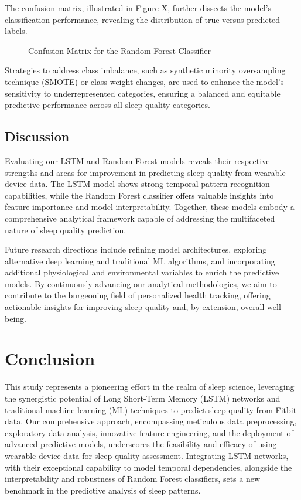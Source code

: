 \documentclass[10pt]{extarticle}
\begin{document}
The confusion matrix, illustrated in Figure X, further dissects the model's classification performance, revealing the distribution of true versus predicted labels.

\begin{figure}[H]
    \centering
    \caption{Confusion Matrix for the Random Forest Classifier}
\end{figure}

Strategies to address class imbalance, such as synthetic minority oversampling technique (SMOTE) or class weight changes, are used to enhance the model's sensitivity to underrepresented categories, ensuring a balanced and equitable predictive performance across all sleep quality categories.

\subsection{Discussion}

Evaluating our LSTM and Random Forest models reveals their respective strengths and areas for improvement in predicting sleep quality from wearable device data. The LSTM model shows strong temporal pattern recognition capabilities, while the Random Forest classifier offers valuable insights into feature importance and model interpretability. Together, these models embody a comprehensive analytical framework capable of addressing the multifaceted nature of sleep quality prediction.

Future research directions include refining model architectures, exploring alternative deep learning and traditional ML algorithms, and incorporating additional physiological and environmental variables to enrich the predictive models. By continuously advancing our analytical methodologies, we aim to contribute to the burgeoning field of personalized health tracking, offering actionable insights for improving sleep quality and, by extension, overall well-being.

\section{Conclusion}

This study represents a pioneering effort in the realm of sleep science, leveraging the synergistic potential of Long Short-Term Memory (LSTM) networks and traditional machine learning (ML) techniques to predict sleep quality from Fitbit data. Our comprehensive approach, encompassing meticulous data preprocessing, exploratory data analysis, innovative feature engineering, and the deployment of advanced predictive models, underscores the feasibility and efficacy of using wearable device data for sleep quality assessment. Integrating LSTM networks, with their exceptional capability to model temporal dependencies, alongside the interpretability and robustness of Random Forest classifiers, sets a new benchmark in the predictive analysis of sleep patterns.
\end{document}
